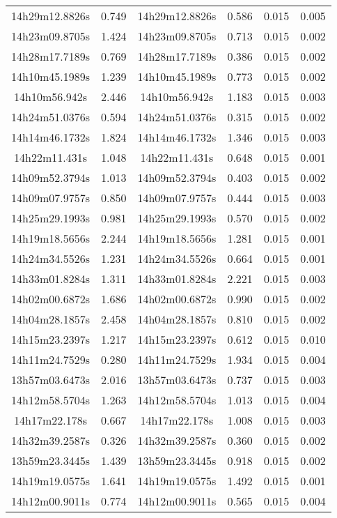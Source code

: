 \begin{table}
\begin{tabular}{cccccc}
14h29m12.8826s & 0.749 & 14h29m12.8826s & 0.586 & 0.015 & 0.005 \\
14h23m09.8705s & 1.424 & 14h23m09.8705s & 0.713 & 0.015 & 0.002 \\
14h28m17.7189s & 0.769 & 14h28m17.7189s & 0.386 & 0.015 & 0.002 \\
14h10m45.1989s & 1.239 & 14h10m45.1989s & 0.773 & 0.015 & 0.002 \\
14h10m56.942s & 2.446 & 14h10m56.942s & 1.183 & 0.015 & 0.003 \\
14h24m51.0376s & 0.594 & 14h24m51.0376s & 0.315 & 0.015 & 0.002 \\
14h14m46.1732s & 1.824 & 14h14m46.1732s & 1.346 & 0.015 & 0.003 \\
14h22m11.431s & 1.048 & 14h22m11.431s & 0.648 & 0.015 & 0.001 \\
14h09m52.3794s & 1.013 & 14h09m52.3794s & 0.403 & 0.015 & 0.002 \\
14h09m07.9757s & 0.850 & 14h09m07.9757s & 0.444 & 0.015 & 0.003 \\
14h25m29.1993s & 0.981 & 14h25m29.1993s & 0.570 & 0.015 & 0.002 \\
14h19m18.5656s & 2.244 & 14h19m18.5656s & 1.281 & 0.015 & 0.001 \\
14h24m34.5526s & 1.231 & 14h24m34.5526s & 0.664 & 0.015 & 0.001 \\
14h33m01.8284s & 1.311 & 14h33m01.8284s & 2.221 & 0.015 & 0.003 \\
14h02m00.6872s & 1.686 & 14h02m00.6872s & 0.990 & 0.015 & 0.002 \\
14h04m28.1857s & 2.458 & 14h04m28.1857s & 0.810 & 0.015 & 0.002 \\
14h15m23.2397s & 1.217 & 14h15m23.2397s & 0.612 & 0.015 & 0.010 \\
14h11m24.7529s & 0.280 & 14h11m24.7529s & 1.934 & 0.015 & 0.004 \\
13h57m03.6473s & 2.016 & 13h57m03.6473s & 0.737 & 0.015 & 0.003 \\
14h12m58.5704s & 1.263 & 14h12m58.5704s & 1.013 & 0.015 & 0.004 \\
14h17m22.178s & 0.667 & 14h17m22.178s & 1.008 & 0.015 & 0.003 \\
14h32m39.2587s & 0.326 & 14h32m39.2587s & 0.360 & 0.015 & 0.002 \\
13h59m23.3445s & 1.439 & 13h59m23.3445s & 0.918 & 0.015 & 0.002 \\
14h19m19.0575s & 1.641 & 14h19m19.0575s & 1.492 & 0.015 & 0.001 \\
14h12m00.9011s & 0.774 & 14h12m00.9011s & 0.565 & 0.015 & 0.004 \\

\end{tabular}
\end{table}
